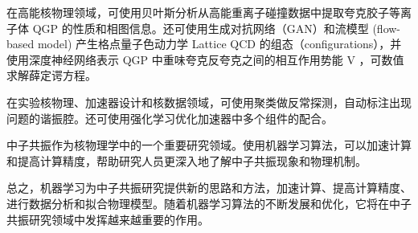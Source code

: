 在高能核物理领域，可使用贝叶斯分析从高能重离子碰撞数据中提取夸克胶子等离子体 QGP 的性质和相图信息\cite{庞龙刚2020深度学习在核物理中的应用}。还可使用生成对抗网络（GAN）和流模型 (flow-based model) 产生格点量子色动力学 Lattice QCD 的组态（configurations），并使用深度神经网络表示 QGP 中重味夸克反夸克之间的相互作用势能 V ，可数值求解薛定谔方程。

在实验核物理、加速器设计和核数据领域，可使用聚类做反常探测，自动标注出现问题的谐振腔。还可使用强化学习\cite{wiering2012reinforcement}优化加速器中多个组件的配合。

中子共振作为核物理学中的一个重要研究领域。使用机器学习算法，可以加速计算和提高计算精度，帮助研究人员更深入地了解中子共振现象和物理机制。



总之，机器学习为中子共振研究提供新的思路和方法，加速计算、提高计算精度、进行数据分析和拟合物理模型。随着机器学习算法的不断发展和优化，它将在中子共振研究领域中发挥越来越重要的作用。









